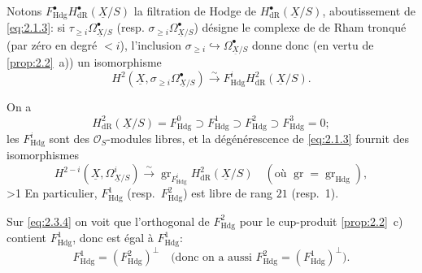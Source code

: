 \documentclass[10pt]{article}
\DeclareMathOperator{\gr}{gr}
\newcommand{\Hdg}{\mathrm{Hdg}}
\newcommand{\UX}{\underline{X}}
\newcommand{\DPage}[2]{\ifnum#1>1\clearpage\fi\setcounter{page}{#2}}
\begin{document}
Notons $F^{\bullet}_{\Hdg} H^{\bullet}_{\mathrm{dR}}(\UX/S)$ la filtration de Hodge de $H^{\bullet}_{\mathrm{dR}}(\UX/S)$, aboutissement de \eqref{eq:2.1.3}: si $\tau_{\geqslant i} \Omega_{\UX/S}^{\bullet}$ (resp. $\sigma_{\geqslant i} \Omega_{\UX/S}^{\bullet}$) désigne le complexe de de Rham tronqué (par zéro en degré $< i$), l'inclusion $\sigma_{\geqslant i} \hookrightarrow \Omega_{\UX/S}^{\bullet}$ donne donc (en vertu de \ref{prop:2.2}~a)) un isomorphisme
\begin{equation}\tag{2.3.4}\label{eq:2.3.4}
H^2(\UX, \sigma_{\geqslant i} \Omega_{\UX/S}^{\bullet}) \xrightarrow{\sim} F^i_{\Hdg} H^2_{\mathrm{dR}}(\UX/S).
\end{equation}

On a
\begin{equation}\tag{2.3.5}\label{eq:2.3.5}
H^2_{\mathrm{dR}}(\UX/S) = F^0_{\Hdg} \supset F^1_{\Hdg} \supset F^2_{\Hdg} \supset F^3_{\Hdg} = 0;
\end{equation}
les $F^i_{\Hdg}$ sont des $\mathcal{O}_S$-modules libres, et la dégénérescence de \eqref{eq:2.1.3} fournit des isomorphismes
\begin{equation}\tag{2.3.6}\label{eq:2.3.6}
H^{2-i}(\UX, \Omega^i_{\UX/S}) \xrightarrow{\sim} \gr_{F^i_{\Hdg}} H^2_{\mathrm{dR}}(\UX/S) \quad (\text{où } \gr = \gr_{\Hdg}),
\end{equation}
\DPage{10}{67}
En particulier, $F^1_{\Hdg}$ (resp.~$F^2_{\Hdg}$) est libre de rang $21$ (resp.~1).

Sur \eqref{eq:2.3.4} on voit que l'orthogonal de $F^2_{\Hdg}$ pour le cup-produit \ref{prop:2.2}~c) contient $F^1_{\Hdg}$, donc est égal à $F^1_{\Hdg}$:
\begin{equation}\tag{2.3.7}\label{eq:2.3.7}
F^1_{\Hdg} = (F^2_{\Hdg})^{\perp} \quad \text{(donc on a aussi } F^2_{\Hdg} = (F^1_{\Hdg})^{\perp}).
\end{equation}
\end{document}
